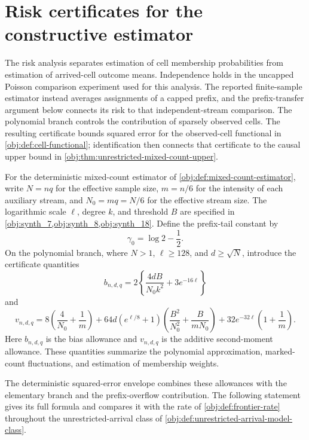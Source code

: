 \section{Risk certificates for the constructive estimator}

The risk analysis separates estimation of cell membership probabilities from estimation of arrived-cell outcome means. Independence holds in the uncapped Poisson comparison experiment used for this analysis. The reported finite-sample estimator instead averages assignments of a capped prefix, and the prefix-transfer argument below connects its risk to that independent-stream comparison. The polynomial branch controls the contribution of sparsely observed cells. The resulting certificate bounds squared error for the observed-cell functional in \cref{obj:def:cell-functional}; identification then connects that certificate to the causal upper bound in \cref{obj:thm:unrestricted-mixed-count-upper}.

For the deterministic mixed-count estimator  of \cref{obj:def:mixed-count-estimator}, write \(N=nq\) for the effective sample size, \(m=n/6\) for the intensity of each auxiliary stream, and \(N_0=mq=N/6\) for the effective stream size. The logarithmic scale \(\ell\), degree \(k\), and threshold \(B\) are specified in \cref{obj:synth_7,obj:synth_8,obj:synth_18}. Define the prefix-tail constant by
\[
\gamma_0=\log 2-\frac12.
\]
On the polynomial branch, where \(N>1\), \(\ell\ge128\), and \(d\ge\sqrt N\), introduce the certificate quantities
\[
b_{n,d,q}
=2\left\{\frac{4dB}{N_0k^2}+3e^{-16\ell}\right\}
\]
and
\[
v_{n,d,q}
=8\left(\frac4{N_0}+\frac1m\right)
+64d(e^{\ell/8}+1)
\left(\frac{B^2}{N_0^2}+\frac{B}{mN_0}\right)
+32e^{-32\ell}\left(1+\frac1m\right).
\]
Here \(b_{n,d,q}\) is the bias allowance and \(v_{n,d,q}\) is the additive second-moment allowance. These quantities summarize the polynomial approximation, marked-count fluctuations, and estimation of membership weights.

The deterministic squared-error envelope  combines these allowances with the elementary branch and the prefix-overflow contribution. The following statement gives its full formula and compares it with the rate  of \cref{obj:def:frontier-rate} throughout the unrestricted-arrival class  of \cref{obj:def:unrestricted-arrival-model-class}.

